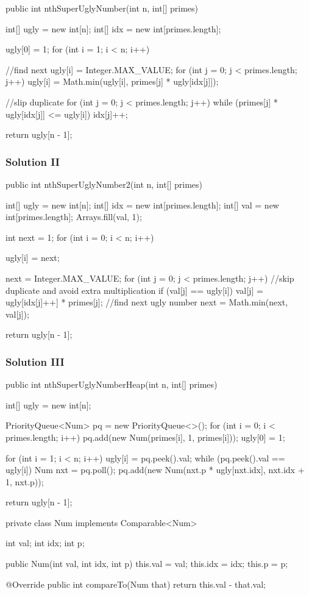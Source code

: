 \begin{Code}
public int nthSuperUglyNumber(int n, int[] primes) {
    int[] ugly = new int[n];
    int[] idx = new int[primes.length];

    ugly[0] = 1;
    for (int i = 1; i < n; i++) {
        //find next
        ugly[i] = Integer.MAX_VALUE;
        for (int j = 0; j < primes.length; j++)
            ugly[i] = Math.min(ugly[i], primes[j] * ugly[idx[j]]);

        //slip duplicate
        for (int j = 0; j < primes.length; j++) {
            while (primes[j] * ugly[idx[j]] <= ugly[i]) idx[j]++;
        }
    }

    return ugly[n - 1];
}

\end{Code}

\subsubsection{Solution II}
\begin{Code}
public int nthSuperUglyNumber2(int n, int[] primes) {
    int[] ugly = new int[n];
    int[] idx = new int[primes.length];
    int[] val = new int[primes.length];
    Arrays.fill(val, 1);

    int next = 1;
    for (int i = 0; i < n; i++) {
        ugly[i] = next;

        next = Integer.MAX_VALUE;
        for (int j = 0; j < primes.length; j++) {
            //skip duplicate and avoid extra multiplication
            if (val[j] == ugly[i]) val[j] = ugly[idx[j]++] * primes[j];
            //find next ugly number
            next = Math.min(next, val[j]);
        }
    }

    return ugly[n - 1];
}
\end{Code}

\subsubsection{Solution III}

\begin{Code}
public int nthSuperUglyNumberHeap(int n, int[] primes) {
    int[] ugly = new int[n];

    PriorityQueue<Num> pq = new PriorityQueue<>();
    for (int i = 0; i < primes.length; i++) pq.add(new Num(primes[i], 1, primes[i]));
    ugly[0] = 1;

    for (int i = 1; i < n; i++) {
        ugly[i] = pq.peek().val;
        while (pq.peek().val == ugly[i]) {
            Num nxt = pq.poll();
            pq.add(new Num(nxt.p * ugly[nxt.idx], nxt.idx + 1, nxt.p));
        }
    }

    return ugly[n - 1];
}

private class Num implements Comparable<Num> {
    int val;
    int idx;
    int p;

    public Num(int val, int idx, int p) {
        this.val = val;
        this.idx = idx;
        this.p = p;
    }

    @Override
    public int compareTo(Num that) {
        return this.val - that.val;
    }
}
\end{Code}

